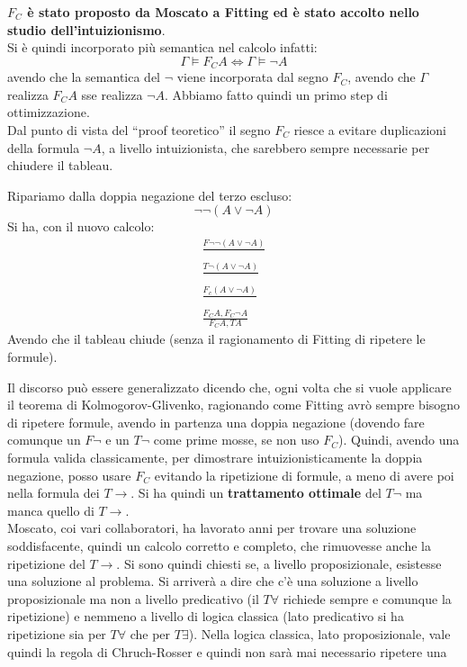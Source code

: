 \documentclass[a4paper,12pt, oneside]{book}
\begin{document}
\textbf{$F_C$ è stato proposto da Moscato a Fitting ed è stato accolto nello
  studio dell'intuizionismo}.\\
Si è quindi incorporato più semantica nel calcolo infatti:
\[\Gamma\vDash F_CA \iff \Gamma\vDash \neg A\]
avendo che la semantica del $\neg$ viene incorporata dal segno $F_C$, avendo che
$\Gamma$ realizza $F_C A$ sse realizza $\neg A$. Abbiamo fatto quindi un primo
step di ottimizzazione.\\
Dal punto di vista del ``proof teoretico'' il segno $F_C$ riesce a evitare
duplicazioni della formula $\neg A$, a livello intuizionista, che sarebbero
sempre necessarie per chiudere il tableau.
\begin{esempio}
  Ripariamo dalla doppia negazione del terzo escluso:
  \[\neg\neg(A\lor \neg A)\]
  Si ha, con il nuovo calcolo:
  \begin{gather*}
    \frac{F\neg\neg(A\lor \neg A)}{}\\
    \frac{T\neg (A\lor \neg A)}{}\\
    \frac{F_c(A\lor\neg A)}{}\\
    \frac{F_C A, F_C\neg A}{F_C A, TA}
  \end{gather*}
  Avendo che il tableau chiude (senza il ragionamento di Fitting di ripetere le
  formule).
\end{esempio}
Il discorso può essere generalizzato dicendo che, ogni volta che si vuole
applicare il teorema di Kolmogorov-Glivenko, ragionando come Fitting avrò sempre
bisogno di ripetere formule, avendo in partenza una doppia negazione (dovendo
fare comunque un $F\neg$ e un $T\neg$ come prime mosse, se non uso
$F_C$). Quindi, avendo una formula valida classicamente, per dimostrare
intuizionisticamente la doppia negazione, posso usare $F_C$ evitando la
ripetizione di formule, a meno di avere poi nella formula dei $T\to$. Si ha
quindi un \textbf{trattamento ottimale} del $T\neg$ ma manca quello di
$T\to$. \\
Moscato, coi vari collaboratori, ha lavorato anni per trovare una
soluzione soddisfacente, quindi un calcolo corretto e completo, che rimuovesse
anche la ripetizione del $T\to$. Si sono quindi chiesti se, a livello
proposizionale, esistesse una soluzione al problema. Si arriverà a dire che c'è
una soluzione a livello proposizionale ma non a livello predicativo (il
$T\forall$ richiede sempre e comunque la ripetizione) e
nemmeno a livello di logica classica (lato predicativo si ha ripetizione sia per
$T\forall$ che per $T\exists$). Nella logica classica, lato proposizionale, vale
quindi la regola di Chruch-Rosser e quindi non sarà mai necessario ripetere una
\end{document}

